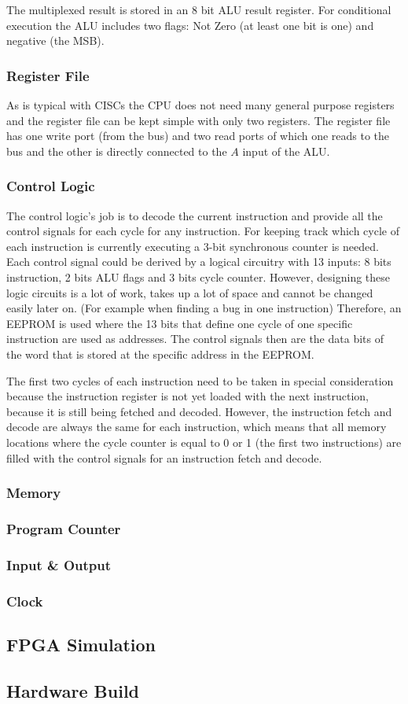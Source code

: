 The multiplexed result is stored in an 8 bit \gls{ALU} result register.
For conditional execution the \gls{ALU} includes two flags: Not Zero (at least one bit is one) and negative (the \gls{MSB}).

\subsubsection{Register File}
As is typical with \glspl{CISC} the \gls{CPU} does not need many general purpose registers and the register file can be kept simple with only two registers.
The register file has one write port (from the bus) and two read ports of which one reads to the bus and the other is directly connected to the $A$ input of the \gls{ALU}.
\subsubsection{Control Logic}
The control logic's job is to decode the current instruction and provide all the control signals for each cycle for any instruction.
For keeping track which cycle of each instruction is currently executing a 3-bit synchronous counter is needed.
Each control signal could be derived by a logical circuitry with 13 inputs: 8 bits instruction, 2 bits \gls{ALU} flags and 3 bits cycle counter.
However, designing these logic circuits is a lot of work, takes up a lot of space and cannot be changed easily later on. (For example when finding a bug in one instruction)
Therefore, an \gls{EEPROM} is used where the 13 bits that define one cycle of one specific instruction are used as addresses.
The control signals then are the data bits of the word that is stored at the specific address in the \gls{EEPROM}.

The first two cycles of each instruction need to be taken in special consideration because the instruction register is not yet loaded with the next instruction, because it is still being fetched and decoded.
However, the instruction fetch and decode are always the same for each instruction, which means that all memory locations where the cycle counter is equal to 0 or 1 (the first two instructions) are filled with the control signals for an instruction fetch and decode.
\subsubsection{Memory}
\subsubsection{Program Counter}
\subsubsection{Input \& Output}
\subsubsection{Clock}

\subsection{FPGA Simulation}
\subsection{Hardware Build}